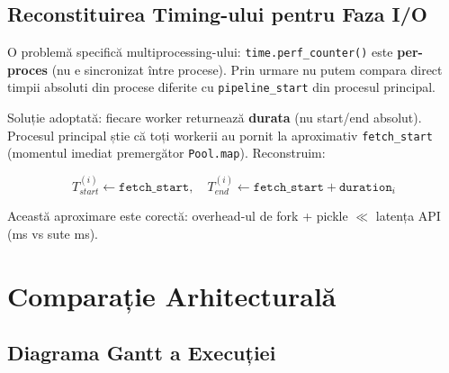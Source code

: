 \documentclass[12pt,a4paper]{article}
\begin{document}
\subsection{Reconstituirea Timing-ului pentru Faza I/O}

O problemă specifică multiprocessing-ului: \texttt{time.perf\_counter()} este \textbf{per-proces} (nu e sincronizat între procese). Prin urmare nu putem compara direct timpii absoluti din procese diferite cu \texttt{pipeline\_start} din procesul principal.

Soluție adoptată: fiecare worker returnează \textbf{durata} (nu start/end absolut). Procesul principal știe că toți workerii au pornit la aproximativ \texttt{fetch\_start} (momentul imediat premergător \texttt{Pool.map}). Reconstruim:

\[ T_{start}^{(i)} \leftarrow \texttt{fetch\_start}, \quad T_{end}^{(i)} \leftarrow \texttt{fetch\_start} + \texttt{duration}_i \]

Această aproximare este corectă: overhead-ul de fork + pickle $\ll$ latența API (ms vs sute ms).

\section{Comparație Arhitecturală}

\subsection{Diagrama Gantt a Execuției}
\end{document}
